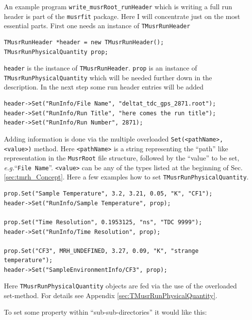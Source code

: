 \documentclass[twoside]{article}
\newcommand{\musrroot}{\texttt{MusrRoot}\xspace}
\newcommand{\musrfit}{\texttt{musrfit}\xspace}
\newcommand{\eg}{\emph{e.g.}\xspace}
\newcommand{\tmrh}{\texttt{TMusrRunHeader}\xspace}
\newcommand{\tquant}{\texttt{TMusrRunPhysicalQuantity}\xspace}
\begin{document}
An example program \verb!write_musrRoot_runHeader! which is writing a full run header is part of the \musrfit package. Here I will concentrate just on the most essential parts. First one needs an instance of \tmrh

\begin{shaded}
\begin{verbatim}  
TMusrRunHeader *header = new TMusrRunHeader();
TMusrRunPhysicalQuantity prop;
\end{verbatim}
\end{shaded}

\noindent \texttt{header} is the instance of \tmrh. \texttt{prop} is an instance of \tquant which will be needed further down in the description. In the next step some run header entries will be added

\begin{shaded}
\begin{verbatim}  
header->Set("RunInfo/File Name", "deltat_tdc_gps_2871.root");
header->Set("RunInfo/Run Title", "here comes the run title");
header->Set("RunInfo/Run Number", 2871);
\end{verbatim}
\end{shaded}

\noindent Adding information is done via the multiple overloaded \verb!Set(<pathName>,<value>)! method. Here \verb!<pathName>! is a string representing the ``path'' like representation in the \musrroot file structure, followed by the ``value'' to be set, \eg ``\texttt{File Name}''. \verb!<value>! can be any of the types listed at the beginning of Sec. \ref{sec:tmrh_Concept}. Here a few examples how to set \tquant.

\begin{shaded}
\begin{verbatim}  
prop.Set("Sample Temperature", 3.2, 3.21, 0.05, "K", "CF1");
header->Set("RunInfo/Sample Temperature", prop);

prop.Set("Time Resolution", 0.1953125, "ns", "TDC 9999");
header->Set("RunInfo/Time Resolution", prop);

prop.Set("CF3", MRH_UNDEFINED, 3.27, 0.09, "K", "strange temperature");
header->Set("SampleEnvironmentInfo/CF3", prop);
\end{verbatim}
\end{shaded}

\noindent Here \tquant objects are fed via the use of the overloaded set-method. For details see Appendix \ref{sec:TMusrRunPhysicalQuantity}.

\noindent To set some property within ``sub-sub-directories'' it would like this:
\end{document}
